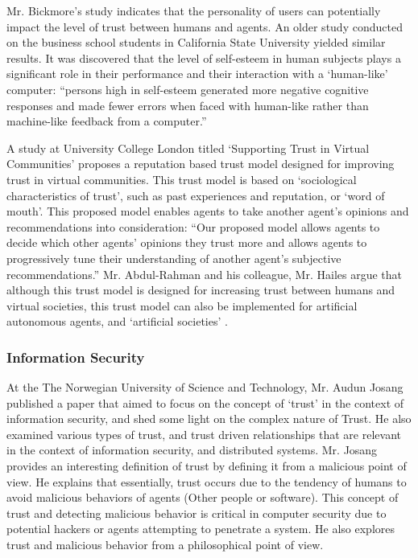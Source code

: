 \documentclass[runningheads,a4paper]{llncs}
\begin{document}
Mr. Bickmore's study indicates that the personality of users can potentially impact the level of trust between humans and agents. An older study conducted on the business school students in California State University yielded similar results. It was discovered that the level of self-esteem in human subjects plays a significant role in their performance and their interaction with a `human-like' computer: ``persons high in self-esteem generated more negative cognitive responses and made fewer errors when faced with human-like rather than machine-like feedback from a computer.'' \cite{resnik1985influence}

A study at University College London titled `Supporting Trust in Virtual Communities' proposes a reputation based trust model designed for improving trust in virtual communities. This trust model is based on `sociological characteristics of trust', such as past experiences and reputation, or `word of mouth'. This proposed model enables agents to take another agent's opinions and recommendations into consideration: ``Our
proposed model allows agents to decide which other
agents’ opinions they trust more and allows agents to
progressively tune their understanding of another agent’s
subjective recommendations.''  Mr. Abdul-Rahman and his colleague, Mr. Hailes argue that although this trust model is designed for increasing trust between humans and virtual societies, this trust model can also be implemented for artificial autonomous agents, and `artificial societies' \cite{abdul2000supporting}.


\subsubsection{Information Security}
At the The Norwegian University of Science and Technology, Mr. Audun Josang published a paper that aimed to focus on the concept of `trust' in the context of information security, and shed some light on the complex nature of Trust. He also examined various types of trust, and trust driven relationships that are relevant in the context of information security, and distributed systems. Mr. Josang provides an interesting definition of trust by defining it from a malicious point of view. He explains that essentially, trust occurs due to the tendency of humans to avoid malicious behaviors of agents (Other people or software). This concept of trust and detecting malicious behavior is critical in computer security due to potential hackers or agents attempting to penetrate a system. He also explores trust and malicious behavior from a philosophical point of view.
\end{document}
